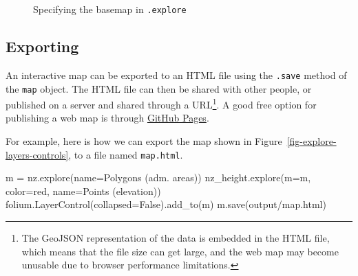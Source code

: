 \documentclass[
  letterpaper,
]{krantz}
\newenvironment{Shaded}{\begin{snugshade}}{\end{snugshade}}
\newcommand{\NormalTok}[1]{\textcolor[rgb]{0.00,0.23,0.31}{#1}}
\newcommand{\OperatorTok}[1]{\textcolor[rgb]{0.37,0.37,0.37}{#1}}
\newcommand{\StringTok}[1]{\textcolor[rgb]{0.13,0.47,0.30}{#1}}
\newcommand{\VariableTok}[1]{\textcolor[rgb]{0.07,0.07,0.07}{#1}}
\begin{document}
\begin{figure}


\caption{\label{fig-explore-basemaps}Specifying the basemap in
\texttt{.explore}}

\end{figure}%

\subsection{Exporting}\label{exporting}

An interactive map can be exported to an HTML file using the
\texttt{.save} method of the \texttt{map} object. The HTML file can then
be shared with other people, or published on a server and shared through
a URL\footnote{The GeoJSON representation of the data is embedded in the
  HTML file, which means that the file size can get large, and the web
  map may become unusable due to browser performance limitations.}. A
good free option for publishing a web map is through
\href{https://pages.github.com/}{GitHub Pages}.

For example, here is how we can export the map shown in
Figure~\ref{fig-explore-layers-controls}, to a file named
\texttt{map.html}.

\begin{Shaded}
\begin{Highlighting}[]
\NormalTok{m }\OperatorTok{=}\NormalTok{ nz.explore(name}\OperatorTok{=}\StringTok{\textquotesingle{}Polygons (adm. areas)\textquotesingle{}}\NormalTok{)}
\NormalTok{nz\_height.explore(m}\OperatorTok{=}\NormalTok{m, color}\OperatorTok{=}\StringTok{\textquotesingle{}red\textquotesingle{}}\NormalTok{, name}\OperatorTok{=}\StringTok{\textquotesingle{}Points (elevation)\textquotesingle{}}\NormalTok{)}
\NormalTok{folium.LayerControl(collapsed}\OperatorTok{=}\VariableTok{False}\NormalTok{).add\_to(m)}
\NormalTok{m.save(}\StringTok{\textquotesingle{}output/map.html\textquotesingle{}}\NormalTok{)}
\end{Highlighting}
\end{Shaded}
\end{document}
